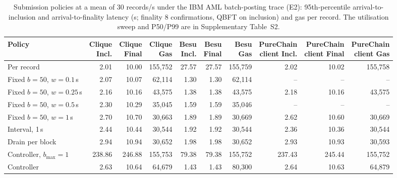 \begin{table}[t]
\centering
\scriptsize
\caption{Submission policies at a mean of 30 records/s under the IBM AML batch-posting trace (E2): 95th-percentile arrival-to-inclusion and arrival-to-finality latency (s; finality 8 confirmations, QBFT on inclusion) and gas per record. The utilisation sweep and P50/P99 are in Supplementary Table~S2.}
\label{tab:e13main}
\begin{adjustbox}{max width=\textwidth}
\begin{tabular}{lrrrrrrrrr}
\toprule
Policy & \makecell{Clique\\Incl.} & \makecell{Clique\\Final} & \makecell{Clique\\Gas} & \makecell{Besu\\Incl.} & \makecell{Besu\\Final} & \makecell{Besu\\Gas} & \makecell{PureChain\\client Incl.} & \makecell{PureChain\\client Final} & \makecell{PureChain\\client Gas} \\
\midrule
Per record & 2.01 & 10.00 & 155,752 & 27.57 & 27.57 & 155,759 & 2.02 & 10.02 & 155,758 \\
Fixed $b{=}50$, $w{=}0.1$\,s & 2.07 & 10.07 & 62,114 & 1.30 & 1.30 & 62,114 & -- & -- & -- \\
Fixed $b{=}50$, $w{=}0.25$\,s & 2.16 & 10.16 & 43,575 & 1.38 & 1.38 & 43,575 & 2.18 & 10.16 & 43,575 \\
Fixed $b{=}50$, $w{=}0.5$\,s & 2.30 & 10.29 & 35,045 & 1.59 & 1.59 & 35,046 & -- & -- & -- \\
Fixed $b{=}50$, $w{=}1$\,s & 2.70 & 10.70 & 30,663 & 1.89 & 1.89 & 30,669 & 2.62 & 10.60 & 30,669 \\
Interval, 1\,s & 2.44 & 10.44 & 30,544 & 1.92 & 1.92 & 30,544 & 2.36 & 10.36 & 30,544 \\
Drain per block & 2.94 & 10.94 & 30,652 & 1.98 & 1.98 & 30,652 & 2.93 & 10.93 & 30,593 \\
Controller, $b_{\max}{=}1$ & 238.86 & 246.88 & 155,753 & 79.38 & 79.38 & 155,752 & 237.43 & 245.44 & 155,752 \\
Controller & 2.63 & 10.64 & 64,679 & 1.43 & 1.43 & 80,300 & 2.64 & 10.63 & 64,879 \\
\bottomrule
\end{tabular}\end{adjustbox}
\end{table}
